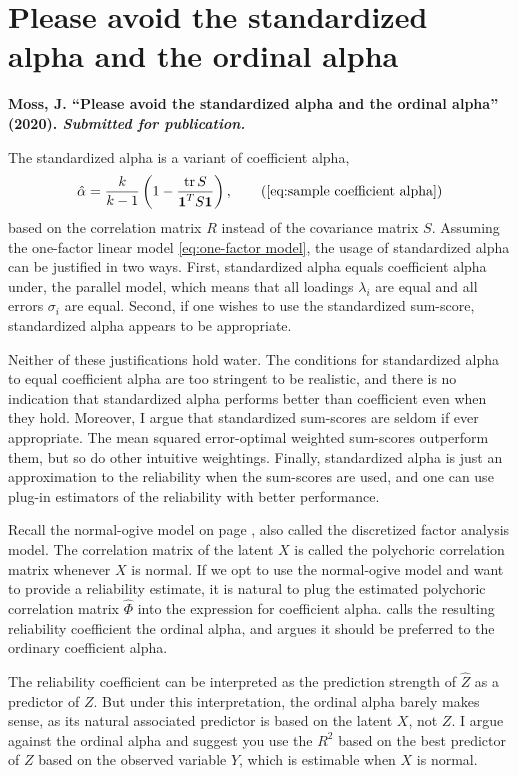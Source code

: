 \section{Please avoid the standardized alpha and the ordinal alpha}
\textbf{Moss, J. ``Please avoid the standardized alpha and the ordinal alpha''
(2020). \emph{Submitted for publication.}}

The standardized alpha is a variant of coefficient alpha,
\begin{equation}
\hat{\alpha}=\frac{k}{k-1}\left(1-\frac{\tr{S}}{\boldsymbol{1}^{T}S\boldsymbol{1}}\right),\tag{\ref{eq:sample coefficient alpha}}
\end{equation}
based on the correlation matrix $R$ instead of the covariance matrix $S$. Assuming the one-factor linear model \eqref{eq:one-factor model}, the usage of standardized alpha can be justified in two ways. First, standardized alpha equals coefficient alpha under, the parallel model, which means that all loadings $\lambda_i$ are equal and all errors $\sigma_i$ are equal. Second, if one wishes to use the standardized sum-score, standardized alpha appears to be appropriate.

Neither of these justifications hold water. The conditions for standardized alpha to equal coefficient alpha are too stringent to be realistic, and there is no indication that standardized alpha performs better than coefficient even when they hold. Moreover, I argue that standardized sum-scores are seldom if ever appropriate. The mean squared error-optimal weighted sum-scores outperform them, but so do other intuitive weightings. Finally, standardized alpha is just an approximation to the reliability when the sum-scores are used, and one can use plug-in estimators of the reliability with better performance.

Recall the normal-ogive model on page \pageref{eq:discretization model}, also called the discretized factor analysis model. The correlation matrix of the latent $X$ is called the polychoric correlation matrix whenever $X$ is normal. If we opt to use the normal-ogive model and want to provide a reliability estimate, it is natural to plug the estimated polychoric correlation matrix $\hat{\Phi}$ into the expression for coefficient alpha. \textcite{Zumbo2007-ap} calls the resulting reliability coefficient the ordinal alpha, and argues it should be preferred to the ordinary coefficient alpha. 

The reliability coefficient can be interpreted as the prediction strength of $\hat{Z}$ as a predictor of $Z$. But under this interpretation, the ordinal alpha barely makes sense, as its natural associated predictor is based on the latent $X$, not $Z$. I argue against the ordinal alpha and suggest you use the $R^2$ based on the best predictor of $Z$ based on the observed variable $Y$, which is estimable when $X$ is normal.

